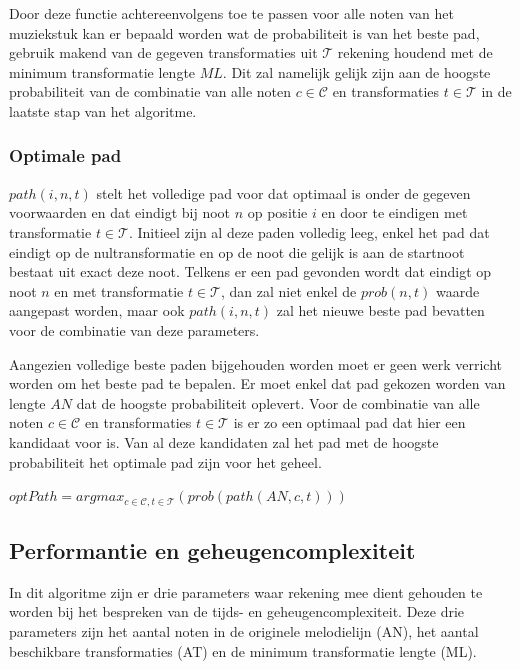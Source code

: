 Door deze functie achtereenvolgens toe te passen voor alle noten van het muziekstuk kan er bepaald worden wat de probabiliteit is van het beste pad, gebruik makend van de gegeven transformaties uit $\mathcal{T}$ rekening houdend met de minimum transformatie lengte $ML$. Dit zal namelijk gelijk zijn aan de hoogste probabiliteit van de combinatie van alle noten $c\in \mathcal{C}$ en transformaties $t\in \mathcal{T}$ in de laatste stap van het algoritme.

\subsubsection{Optimale pad}
$path(i,n,t)$ stelt het volledige pad voor dat optimaal is onder de gegeven voorwaarden en dat eindigt bij noot $n$ op positie $i$ en door te eindigen met transformatie $t\in \mathcal{T}$. Initieel zijn al deze paden volledig leeg, enkel het pad dat eindigt op de nultransformatie en op de noot die gelijk is aan de startnoot bestaat uit exact deze noot. Telkens er een pad gevonden wordt dat eindigt op  noot $n$ en met transformatie $t\in \mathcal{T}$, dan zal niet enkel de $prob(n,t)$ waarde aangepast worden, maar ook $path(i,n,t)$ zal het nieuwe beste pad bevatten voor de combinatie van deze parameters.

Aangezien volledige beste paden bijgehouden worden moet er geen werk verricht worden om het beste pad te bepalen. Er moet enkel dat pad gekozen worden van lengte $AN$ dat de hoogste probabiliteit oplevert. Voor de combinatie van alle noten $c\in \mathcal{C}$ en transformaties $t\in \mathcal{T}$ is er zo een optimaal pad dat hier een kandidaat voor is. Van al deze kandidaten zal het pad met de hoogste probabiliteit het optimale pad zijn voor het geheel.

\begin{framed}
\noindent
$optPath=argmax_{c\in \mathcal{C}, t\in \mathcal{T}}(prob(path(AN,c,t)))$
\end{framed}

\subsection{Performantie en geheugencomplexiteit}
In dit algoritme zijn er drie parameters waar rekening mee dient gehouden te worden bij het bespreken van de tijds- en geheugencomplexiteit. Deze drie parameters zijn het aantal noten in de originele melodielijn (AN), het aantal beschikbare transformaties (AT) en de minimum transformatie lengte (ML).

